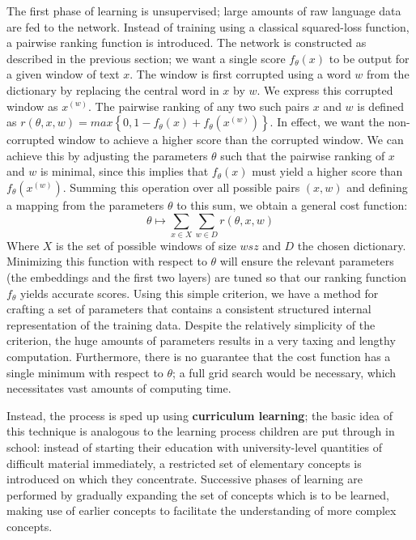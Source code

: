 The first phase of learning is unsupervised; large amounts of raw
language data are fed to the network. Instead of training using a
classical squared-loss function, a pairwise ranking function is
introduced. The network is constructed as described in the previous
section; we want a single score $f_{\theta}(x)$ to be output for a
given window of text $x$.  The window is first corrupted using a word
$w$ from the dictionary by replacing the central word in $x$ by
$w$. We express this corrupted window as $x^{(w)}$. The pairwise
ranking of any two such pairs $x$ and $w$ is defined as $r(\theta, x, w) = max\left\{0,
1 - f_{\theta}(x) + f_{\theta}(x^{(w)})\right\}$. 
In effect, we want the non-corrupted window to achieve a higher score
than the corrupted window. We can achieve this by adjusting the
parameters $\theta$ such that the pairwise ranking of $x$ and $w$ is
minimal, since this implies that $f_{\theta}(x)$ must yield a higher
score than $f_{\theta}(x^{(w)})$. Summing this operation over all
possible pairs $(x, w)$ and defining a mapping from the parameters
$\theta$ to this sum, we obtain a general cost function:
\begin{equation}
\theta \mapsto \sum\limits_{x \in X} \sum\limits_{w \in D} r(\theta, x, w)
\end{equation}
Where $X$ is the set of possible windows of size $wsz$ and $D$ the chosen
dictionary. Minimizing this function with respect to $\theta$ will
ensure the relevant parameters (the embeddings and the first two
layers) are tuned so that our ranking function $f_{\theta}$ yields
accurate scores. Using this simple criterion, we have a method for
crafting a set of parameters that contains a consistent structured
internal representation of the training data. Despite the relatively
simplicity of the criterion, the huge amounts of parameters results in
a very taxing and lengthy computation. Furthermore, there is no
guarantee that the cost function has a single minimum with respect to
$\theta$; a full grid search would be necessary, which necessitates
vast amounts of computing time. 

Instead, the process is sped up using \textbf{curriculum learning};
the basic idea of this technique is analogous to the learning process
children are put through in school: instead of starting their
education with university-level quantities of difficult material
immediately, a restricted set of elementary concepts is introduced on
which they concentrate. Successive phases of learning are performed by
gradually expanding the set of concepts which is to be learned, making
use of earlier concepts to facilitate the understanding of more
complex concepts.
 
